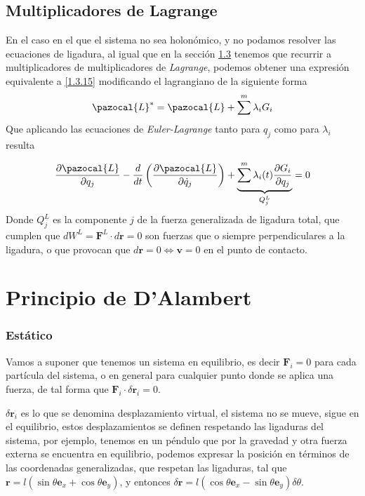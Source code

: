 \subsection{Multiplicadores de Lagrange}
En el caso en el que el sistema no sea holonómico, y no podamos resolver las ecuaciones de ligadura, al igual que en la sección  \hyperref[sec:1.3]{1.3} tenemos que recurrir a multiplicadores de multiplicadores de \textit{Lagrange}, podemos obtener una expresión equivalente a \eqref{1.3.15} modificando el lagrangiano de la siguiente forma
\begin{equation} \label{2.3.4}
    \pazocal{L}^* = \pazocal{L}+\sum^m{\lambda_i G_i}
\end{equation} 
Que aplicando las ecuaciones de \textit{Euler-Lagrange} tanto para $q_j$ como para $\lambda_i$ resulta

\vspace{-10pt}
\Large\begin{equation} \label{2.3.5}
    \frac{\partial \pazocal{L}}{\partial q_j} -\frac{d}{dt}\left(\frac{\partial \pazocal{L}}{\partial \dot{q}_j}\right) +\underbrace{\sum^m\lambda_i(t)\frac{\partial G_i}{\partial q_j}}_{Q^L_j}=0
\end{equation} \normalsize
Donde $Q^L_j$ es la componente $j$ de la fuerza generalizada de ligadura total, que cumplen que $dW^L = \mathbf{F}^L\cdot d\mathbf{r}=0$ son fuerzas que o siempre perpendiculares a la ligadura, o que provocan que $d\mathbf{r}=0 \iff \mathbf{v}=0$ en el punto de contacto.

\section{Principio de D'Alambert}
\subsubsection{Estático}
Vamos a suponer que tenemos un sistema en equilibrio, es decir $\mathbf{F}_i = 0$ para cada partícula del sistema, o en general para cualquier punto donde se aplica una fuerza, de tal forma que $\mathbf{F}_i \cdot \delta \mathbf{r}_i = 0$.

$\delta \mathbf{r}_i$ es lo que se denomina desplazamiento virtual, el sistema no se mueve, sigue en el equilibrio, estos desplazamientos se definen respetando las ligaduras del sistema, por ejemplo, tenemos en un péndulo que por la gravedad y otra fuerza externa se encuentra en equilibrio, podemos expresar la posición en términos de las coordenadas generalizadas, que respetan las ligaduras, tal que $\mathbf{r} = l (\sin \theta \mathbf{e}_x + \cos \theta \mathbf{e}_y)$, y entonces $\delta \mathbf{r} = l (\cos \theta \mathbf{e}_x-\sin\theta \mathbf{e}_y) \delta \theta$.

